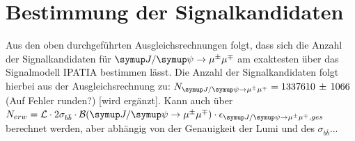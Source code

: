\section{Bestimmung der Signalkandidaten}
Aus den oben durchgeführten Ausgleichsrechnungen folgt, dass sich die Anzahl der Signalkandidaten für $\kontroll$ am exaktesten über das Signalmodell \textsc{IPATIA} bestimmen lässt. Die Anzahl der Signalkandidaten folgt hierbei aus der Ausgleichsrechnung zu: $N_{\kontroll}=1337610\,\pm\,1066$ (Auf Fehler runden?) [wird ergänzt].
Kann auch über $N_{erw}=\mathcal{L}\cdot 2\sigma_{b\bar{b}}\cdot\mathcal{B}(\kontroll)\cdot\epsilon_{\kontroll, ges}$ berechnet werden, aber abhängig von der Genauigkeit der Lumi und des $\sigma_{b\bar{b}}$...
